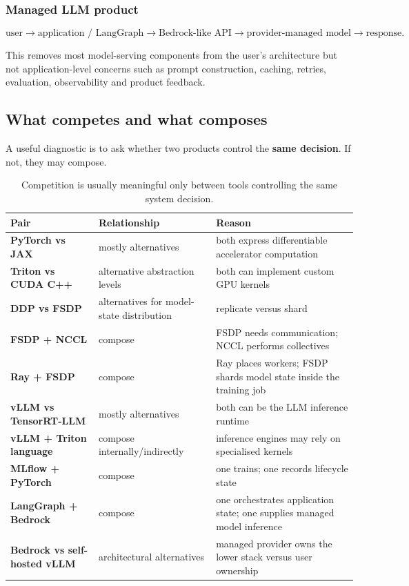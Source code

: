 \subsubsection*{Managed LLM product}

\[
\text{user}
\rightarrow
\text{application / LangGraph}
\rightarrow
\text{Bedrock-like API}
\rightarrow
\text{provider-managed model}
\rightarrow
\text{response}.
\]

This removes most model-serving components from the user's architecture but not application-level concerns such as prompt construction, caching, retries, evaluation, observability and product feedback.


\subsection{What competes and what composes}

A useful diagnostic is to ask whether two products control the \textbf{same decision}.
If not, they may compose.

\begin{table}[ht]
\centering
\small
\begin{tabularx}{\textwidth}{>{\bfseries}p{3.1cm} X X}
\toprule
Pair & Relationship & Reason \\
\midrule
PyTorch vs JAX & mostly alternatives & both express differentiable accelerator computation \\
Triton vs CUDA C++ & alternative abstraction levels & both can implement custom GPU kernels \\
DDP vs FSDP & alternatives for model-state distribution & replicate versus shard \\
FSDP + NCCL & compose & FSDP needs communication; NCCL performs collectives \\
Ray + FSDP & compose & Ray places workers; FSDP shards model state inside the training job \\
vLLM vs TensorRT-LLM & mostly alternatives & both can be the LLM inference runtime \\
vLLM + Triton language & compose internally/indirectly & inference engines may rely on specialised kernels \\
MLflow + PyTorch & compose & one trains; one records lifecycle state \\
LangGraph + Bedrock & compose & one orchestrates application state; one supplies managed model inference \\
Bedrock vs self-hosted vLLM & architectural alternatives & managed provider owns the lower stack versus user ownership \\
\bottomrule
\end{tabularx}
\caption{Competition is usually meaningful only between tools controlling the same system decision.}
\label{tab:compose-compete}
\end{table}


